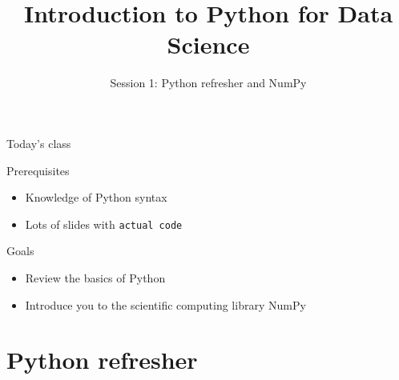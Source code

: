 

\title{Introduction to Python for Data Science}
\subtitle{Session 1: Python refresher and NumPy}



\maketitle

\begin{frame}{Today's class}
    \begin{block}{Prerequisites}
        \begin{itemize}
            \item Knowledge of Python syntax
            \item Lots of slides with \texttt{actual code}
        \end{itemize}
    \end{block}
    \vfill
    \begin{block}{Goals}
        \begin{itemize}
            \item Review the basics of Python
            \item Introduce you to the scientific computing library NumPy
        \end{itemize}
    \end{block}
\end{frame}

\section{Python refresher}

